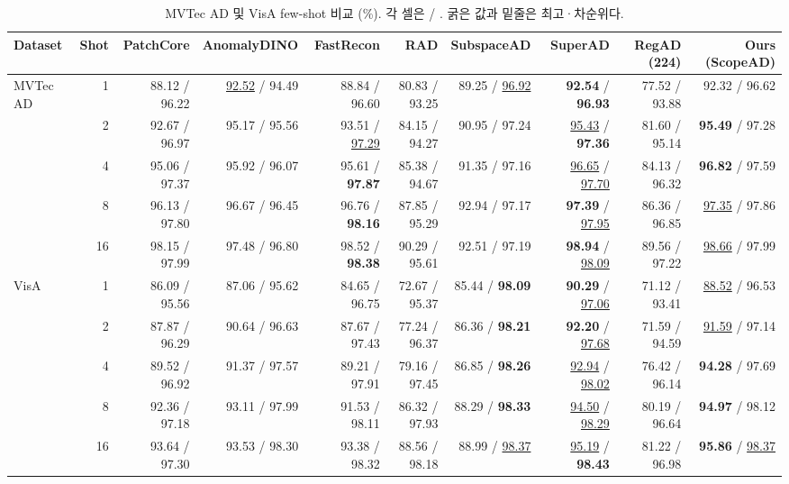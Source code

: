 \setcounter{table}{3}
\begin{table}[!tp]
\centering
\scriptsize
\setlength{\tabcolsep}{5pt}
\caption{MVTec AD 및 VisA few-shot 비교 (\%). 각 셀은 \IAUROC{} / \PAUROC{}. 굵은 값과 밑줄은 최고·차순위다.}
\label{tab:mvtec_visa_fewshot}
\begin{tabular}{l r r r r r r r r r}
\toprule
Dataset & Shot & PatchCore & AnomalyDINO & FastRecon & RAD & SubspaceAD & SuperAD & RegAD (224) & Ours (ScopeAD) \\
\midrule
MVTec AD & 1 & 88.12 / 96.22 & \underline{92.52} / 94.49 & 88.84 / 96.60 & 80.83 / 93.25 & 89.25 / \underline{96.92} & \textbf{92.54} / \textbf{96.93} & 77.52 / 93.88 & 92.32 / 96.62 \\
         & 2 & 92.67 / 96.97 & 95.17 / 95.56 & 93.51 / \underline{97.29} & 84.15 / 94.27 & 90.95 / 97.24 & \underline{95.43} / \textbf{97.36} & 81.60 / 95.14 & \textbf{95.49} / 97.28 \\
         & 4 & 95.06 / 97.37 & 95.92 / 96.07 & 95.61 / \textbf{97.87} & 85.38 / 94.67 & 91.35 / 97.16 & \underline{96.65} / \underline{97.70} & 84.13 / 96.32 & \textbf{96.82} / 97.59 \\
         & 8 & 96.13 / 97.80 & 96.67 / 96.45 & 96.76 / \textbf{98.16} & 87.85 / 95.29 & 92.94 / 97.17 & \textbf{97.39} / \underline{97.95} & 86.36 / 96.85 & \underline{97.35} / 97.86 \\
         & 16 & 98.15 / 97.99 & 97.48 / 96.80 & 98.52 / \textbf{98.38} & 90.29 / 95.61 & 92.51 / 97.19 & \textbf{98.94} / \underline{98.09} & 89.56 / 97.22 & \underline{98.66} / 97.99 \\
\midrule
VisA     & 1 & 86.09 / 95.56 & 87.06 / 95.62 & 84.65 / 96.75 & 72.67 / 95.37 & 85.44 / \textbf{98.09} & \textbf{90.29} / \underline{97.06} & 71.12 / 93.41 & \underline{88.52} / 96.53 \\
         & 2 & 87.87 / 96.29 & 90.64 / 96.63 & 87.67 / 97.43 & 77.24 / 96.37 & 86.36 / \textbf{98.21} & \textbf{92.20} / \underline{97.68} & 71.59 / 94.59 & \underline{91.59} / 97.14 \\
         & 4 & 89.52 / 96.92 & 91.37 / 97.57 & 89.21 / 97.91 & 79.16 / 97.45 & 86.85 / \textbf{98.26} & \underline{92.94} / \underline{98.02} & 76.42 / 96.14 & \textbf{94.28} / 97.69 \\
         & 8 & 92.36 / 97.18 & 93.11 / 97.99 & 91.53 / 98.11 & 86.32 / 97.93 & 88.29 / \textbf{98.33} & \underline{94.50} / \underline{98.29} & 80.19 / 96.64 & \textbf{94.97} / 98.12 \\
         & 16 & 93.64 / 97.30 & 93.53 / 98.30 & 93.38 / 98.32 & 88.56 / 98.18 & 88.99 / \underline{98.37} & \underline{95.19} / \textbf{98.43} & 81.22 / 96.98 & \textbf{95.86} / \underline{98.37} \\
\bottomrule
\end{tabular}
\end{table}
\setcounter{table}{1}

